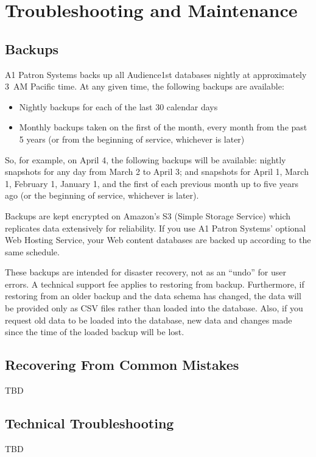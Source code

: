 \section{Troubleshooting and Maintenance}

\subsection{Backups}
\label{sec:backups}

A1 Patron Systems backs up all Audience1st databases nightly at
approximately 3~AM Pacific time.  At any given time, the following
backups are available:

\begin{itemize}
\item Nightly backups for each of the last 30 calendar days
\item Monthly backups taken on the first of the month, every month from
  the past 5 years (or from the beginning of service, whichever is later)
\end{itemize}

So, for example, on April  4, the following backups will be
available: nightly snapshots for any day from March 2 to April 3;
and snapshots for April 1, March 1, February 1, January 1, and the
first of each previous  month up to five years ago (or the beginning of
service, whichever is later).

Backups are kept encrypted on Amazon's S3 (Simple Storage Service) which
replicates data extensively for reliability.
If you use A1 Patron Systems' optional Web Hosting Service, your Web
content databases are backed up according to the same schedule.

These backups are intended for disaster recovery, not as an ``undo''
for user errors.  A technical support fee applies to restoring from
backup.  Furthermore, if restoring from an older backup and the data
schema has changed, the data will be provided only as CSV files rather
than loaded into the database.  Also, if you request old data to be
loaded into the database, new data and changes made since the time of
the loaded backup will be lost.


\subsection{Recovering From Common Mistakes}
\label{sec:recovering}

TBD

\subsection{Technical Troubleshooting}

TBD
